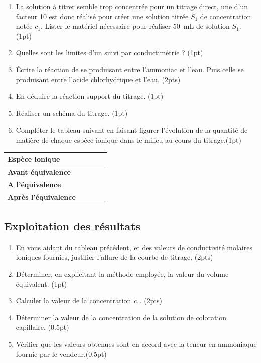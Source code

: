 \documentclass[a4paper,11pt,fleqn]{article}%
\begin{document}
\begin{enumerate}
	\item La solution à titrer semble trop concentrée pour un titrage direct, une  d'un facteur 10 est donc réalisé pour créer une solution titrée $S_1$ de concentration notée $c_1$. Lister le matériel nécessaire pour réaliser \SI{50}{mL} de solution $S_1$. (1pt)
	\item Quelles sont les limites d'un suivi par conductimétrie ? (1pt)
	\item Écrire la réaction de se produisant entre l'ammoniac  et l'eau. Puis celle se produisant entre l'acide chlorhydrique  et l'eau. (2pts)
	\item En déduire la réaction support du titrage. (1pt)
	\item Réaliser un schéma du titrage. (1pt)
	\item Compléter le tableau suivant en faisant figurer l'évolution de la quantité de matière de chaque espèce ionique dans le milieu au cours du titrage.(1pt)
\end{enumerate}
\begin{table}[h!]
\centering
	\begin{tabular}{|>{\centering}m{}|>{\centering}m{}|>{\centering}m{}|>{\centering}m{}|>{\centering\arraybackslash}m{}|} \hline
	\textbf{Espèce ionique} & &&&\\ \hline
	\textbf{Avant équivalence} & &&&\\ \hline
	\textbf{A l'équivalence} & &&&\\ \hline
	\textbf{Après l'équivalence} & &&&\\ \hline
	\end{tabular}
\end{table}

	\subsection{Exploitation des résultats}

\begin{enumerate}[resume]
	\item En vous aidant du tableau précédent, et des valeurs de conductivité molaires ioniques fournies, justifier l'allure de la courbe de titrage. (2pts)
	\item Déterminer, en explicitant la méthode employée, la valeur du volume équivalent. (1pt)
	\item Calculer la valeur de la concentration $c_1$. (2pts)
	\item Déterminer la valeur de la concentration de la solution de coloration capillaire. (0.5pt)
	\item Vérifier que les valeurs obtenues sont en accord avec la teneur en ammoniaque fournie par le vendeur.(0.5pt)
\end{enumerate}
\end{document}
